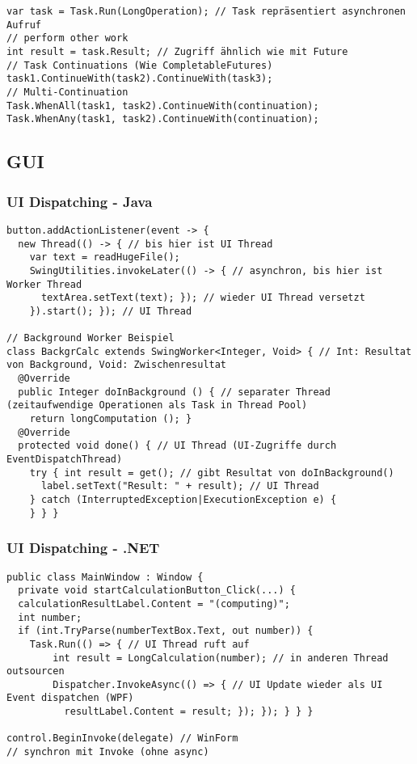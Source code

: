 \begin{lstlisting}
var task = Task.Run(LongOperation); // Task repräsentiert asynchronen Aufruf
// perform other work
int result = task.Result; // Zugriff ähnlich wie mit Future
// Task Continuations (Wie CompletableFutures)
task1.ContinueWith(task2).ContinueWith(task3);
// Multi-Continuation
Task.WhenAll(task1, task2).ContinueWith(continuation);
Task.WhenAny(task1, task2).ContinueWith(continuation);
\end{lstlisting}

\subsection{GUI}

\subsubsection{UI Dispatching - Java}

\begin{lstlisting}
button.addActionListener(event -> {
  new Thread(() -> { // bis hier ist UI Thread
    var text = readHugeFile();
    SwingUtilities.invokeLater(() -> { // asynchron, bis hier ist Worker Thread
      textArea.setText(text); }); // wieder UI Thread versetzt
    }).start(); }); // UI Thread

// Background Worker Beispiel
class BackgrCalc extends SwingWorker<Integer, Void> { // Int: Resultat von Background, Void: Zwischenresultat
  @Override
  public Integer doInBackground () { // separater Thread (zeitaufwendige Operationen als Task in Thread Pool)
    return longComputation (); }
  @Override
  protected void done() { // UI Thread (UI-Zugriffe durch EventDispatchThread)
    try { int result = get(); // gibt Resultat von doInBackground()
      label.setText("Result: " + result); // UI Thread
    } catch (InterruptedException|ExecutionException e) {
    } } }
\end{lstlisting}

\subsubsection{UI Dispatching - .NET}

\begin{lstlisting}
public class MainWindow : Window {
  private void startCalculationButton_Click(...) {
  calculationResultLabel.Content = "(computing)";
  int number;
  if (int.TryParse(numberTextBox.Text, out number)) {
    Task.Run(() => { // UI Thread ruft auf
    	int result = LongCalculation(number); // in anderen Thread outsourcen
    	Dispatcher.InvokeAsync(() => { // UI Update wieder als UI Event dispatchen (WPF)
    	  resultLabel.Content = result; }); }); } } }

control.BeginInvoke(delegate) // WinForm
// synchron mit Invoke (ohne async)
\end{lstlisting}

